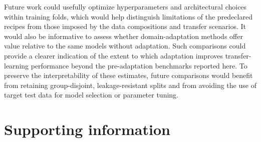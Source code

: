 \documentclass[10pt,letterpaper]{article}
\newcommand{\supportinginformationstyle}{%
  \captionsetup[table]{labelformat=plossupporting,labelsep=period}%
  \setcounter{table}{0}%
  \renewcommand{\thetable}{\arabic{table}}%
}
\begin{document}
Future work could usefully optimize hyperparameters and architectural choices
within training folds, which would help distinguish limitations of the
predeclared recipes from those imposed by the data compositions and transfer
scenarios. It would also be informative to assess whether domain-adaptation
methods offer value relative to the same models without adaptation. Such
comparisons could provide a clearer indication of the extent to which
adaptation improves transfer-learning performance beyond the pre-adaptation
benchmarks reported here. To preserve the interpretability of these estimates,
future comparisons would benefit from retaining group-disjoint,
leakage-resistant splits and from avoiding the use of target test data for
model selection or parameter tuning.

%

\nolinenumbers



\section*{Supporting information}

\supportinginformationstyle






\end{document}
